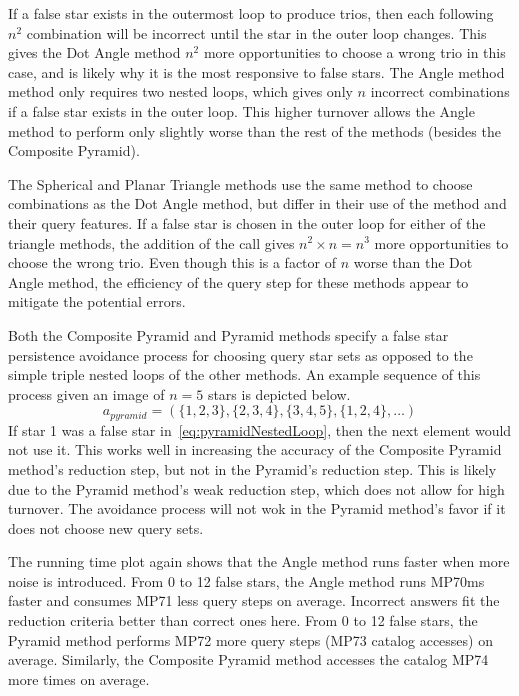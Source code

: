 If a false star exists in the outermost loop to produce trios, then each following $n^2$ combination will be incorrect
until the star in the outer loop changes.
This gives the Dot Angle method $n^2$ more opportunities to choose a wrong trio in this case, and is likely why it is
the most responsive to false stars.
The Angle method method only requires two nested loops, which gives only $n$ incorrect combinations if a false star
exists in the outer loop.
This higher turnover allows the Angle method to perform only slightly worse than the rest of the methods (besides
the Composite Pyramid).

The Spherical and Planar Triangle methods use the same method to choose combinations as the Dot Angle method, but differ
in their use of the  method and their query features.
If a false star is chosen in the outer loop for either of the triangle methods, the addition of the  call
gives $n^2 \times n = n^3$ more opportunities to choose the wrong trio.
Even though this is a factor of $n$ worse than the Dot Angle method, the efficiency of the query step for these
methods appear to mitigate the potential errors.

Both the Composite Pyramid and Pyramid methods specify a false star persistence avoidance process for choosing
query star sets as opposed to the simple triple nested loops of the other methods.
An example sequence of this process given an image of $n=5$ stars is depicted below.
\begin{equation}\label{eq:pyramidNestedLoop}
a_{pyramid} = ( \{1,2,3\}, \{2,3,4\}, \{3,4,5\}, \{1,2,4\}, \ldots)
\end{equation}
If star 1 was a false star in~\autoref{eq:pyramidNestedLoop}, then the next element would not use it.
This works well in increasing the accuracy of the Composite Pyramid method's reduction step, but not in the Pyramid's
reduction step.
This is likely due to the Pyramid method's weak reduction step, which does not allow for high turnover.
The avoidance process will not wok in the Pyramid method's favor if it does not choose new query sets.

The running time plot again shows that the Angle method runs faster when more noise is introduced.
From 0 to 12 false stars, the Angle method runs MP70ms faster and consumes MP71 less query steps on average.
Incorrect answers fit the reduction criteria better than correct ones here.
From 0 to 12 false stars, the Pyramid method performs MP72 more query steps (MP73 catalog accesses) on average.
Similarly, the Composite Pyramid method accesses the catalog MP74 more times on average.

